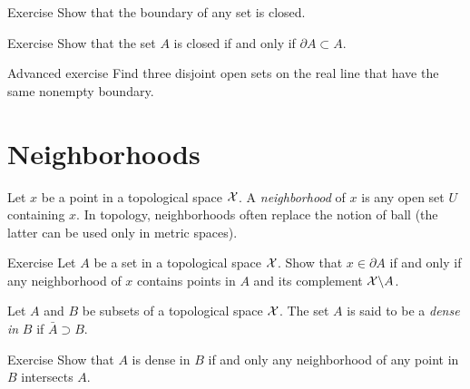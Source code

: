 \begin{thm}{Exercise}
Show that the boundary of any set is closed.
\end{thm}

\begin{thm}{Exercise}
Show that the set $A$ is closed if and only if $\partial A\subset A$.
\end{thm}

\begin{thm}{Advanced exercise}
Find three disjoint open sets on the real line 
that have the same nonempty boundary.
\end{thm}

\section{Neighborhoods}

Let $x$ be a point in a topological space $\mathcal{X}$.
A \emph{neighborhood} of $x$ is any open set $U$ containing $x$.
In topology, neighborhoods often replace the notion of ball (the latter can be used only in metric spaces).  


\begin{thm}{Exercise}
Let $A$ be a set in a topological space $\mathcal{X}$.
Show that $x\in \partial A$ if and only if any neighborhood of $x$ contains points in $A$ and its complement $\mathcal{X}\backslash A$. 
\end{thm}

Let $A$ and $B$ be subsets of a topological space $\mathcal{X}$.
The set $A$ is said to be a \emph{dense in}  $B$ if $\bar A\supset B$.

\begin{thm}{Exercise} Show that $A$ is dense in $B$ if and only any neighborhood of any point in $B$ intersects $A$.
\end{thm}


